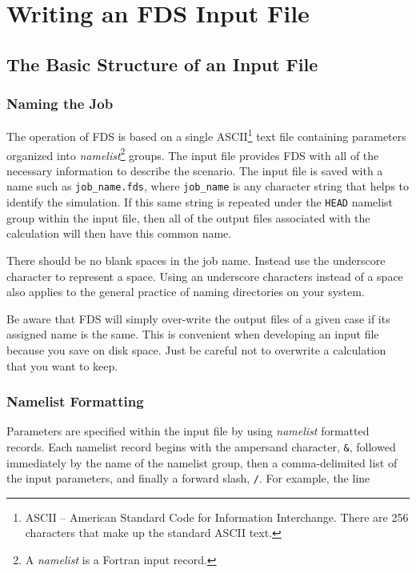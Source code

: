 \documentclass[11pt]{book}
\newcommand{\ct}{\tt\small}
\begin{document}
\part{Writing an FDS Input File}
\label{info:inputfilecreation}



\chapter{The Basic Structure of an Input File}
\label{info:fdsBasic}


\section{Naming the Job}

The operation of FDS is based on a single ASCII\footnote{ASCII -- American Standard Code
for Information Interchange. There are 256 characters that make up the standard ASCII text.} text file containing parameters organized into
{\em namelist}\footnote{A {\em namelist} is a Fortran input record.} groups.
The input file provides FDS  with all of the necessary information to
describe the scenario.
The input file is saved with a name such as {\ct job\_name.fds},
where {\ct job\_name} is any character string that helps to identify
the simulation. If this same string is repeated under the {\ct HEAD} namelist group within the
input file, then all of the output files associated with the calculation will then have this common name.

There should be no blank spaces in the job name. Instead use the underscore
character to represent a space.  Using an underscore characters instead of a space also applies
to the general practice of naming directories on your system.

Be aware that FDS will simply over-write the output files of a given case if its assigned
name is the same. This is convenient when developing an input file because you save on disk space. Just be careful
not to overwrite a calculation that you want to keep.



\section{Namelist Formatting}

\noindent
Parameters are specified within the input file by using {\em namelist} formatted records.
Each namelist record begins with the ampersand character, {\ct \&}, followed
immediately by the name of the namelist group, then a comma-delimited list of the input parameters, and
finally a forward slash, {\ct /}. For example, the line
\end{document}
